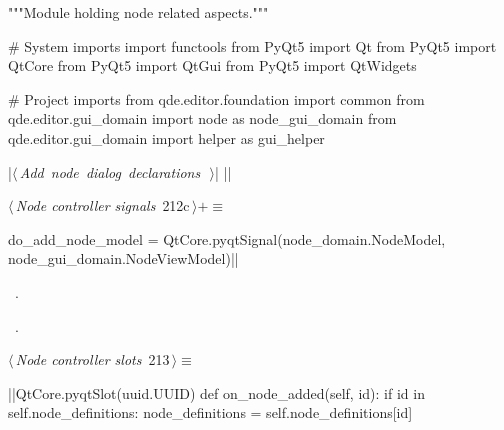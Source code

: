 \documentclass[%
    a4paper,    %
    justified,  %
    nobib,      %
    openany     %
]{tufte-book}
\makeatletter
\renewcommand{\label}[1]{\@tufte@label{##1}}%
\makeatother
\begin{document}
\begin{fullwidth}
\begin{flushleft}
\begin{minipage}{\linewidth}
\begin{pythoncode}
"""Module holding node related aspects."""

# System imports
import functools
from PyQt5 import Qt
from PyQt5 import QtCore
from PyQt5 import QtGui
from PyQt5 import QtWidgets

# Project imports
from qde.editor.foundation import common
from qde.editor.gui_domain import node   as node_gui_domain
from qde.editor.gui_domain import helper as gui_helper


|\hbox{$\langle\,${\itshape Add node dialog declarations}\nobreak\ {\footnotesize {}}$\,\rangle$}|
|\NWsep|
\end{pythoncode}
\vspace{1.5ex}
\footnotesize
\begin{list}{}{\setlength{\itemsep}{-\parsep}\setlength{\itemindent}{-\leftmargin}}

\item{}
\end{list}
\end{minipage}\vspace{4ex}
\end{flushleft}
\begin{flushleft} \small
\begin{minipage}{\linewidth}\label{scrap214}\raggedright\small
{} $\langle\,${\itshape Node controller signals}\nobreak\ {\footnotesize {212c}}$\,\rangle+\equiv$
\vspace{-1ex}
\begin{pythoncode}
do_add_node_model = QtCore.pyqtSignal(node_domain.NodeModel, node_gui_domain.NodeViewModel)|\NWsep|
\end{pythoncode}
\vspace{1.5ex}
\footnotesize
\begin{list}{}{\setlength{\itemsep}{-\parsep}\setlength{\itemindent}{-\leftmargin}}
\item \NWtxtMacroDefBy\ .
\item \NWtxtMacroRefIn\ .

\item{}
\end{list}
\end{minipage}\vspace{4ex}
\end{flushleft}
\begin{flushleft} \small
\begin{minipage}{\linewidth}\label{scrap215}\raggedright\small
{} $\langle\,${\itshape Node controller slots}\nobreak\ {\footnotesize {213}}$\,\rangle\equiv$
\vspace{-1ex}
\begin{pythoncode}
|\normalfont{}\fontfamily{}|QtCore.pyqtSlot(uuid.UUID)
def on_node_added(self, id):
    if id in self.node_definitions:
        node_definitions = self.node_definitions[id]


\end{pythoncode}
\end{minipage}
\end{flushleft}
\end{fullwidth}
\end{document}
